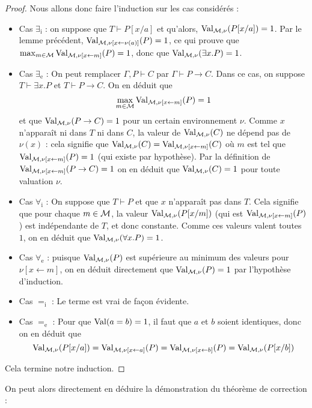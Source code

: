 \begin{proof}
    Nous allons donc faire l'induction sur les cas considérés :
    \begin{itemize}[label=$\bullet$]
        \item Cas $\exists_\mathrm i$ : on suppose que $T\vdash P[x/a]$ et qu'alors, $\mathrm{Val}_{\mathcal M,\nu}(P[x/a]) = 1$. Par le lemme précédent, $\mathrm{Val}_{\mathcal M,\nu[x \leftarrow \nu(a)]}(P)=1$, ce qui prouve que $\max_{m\in\mathcal M} \mathrm{Val}_{\mathcal M,\nu[x \leftarrow m]}(P) = 1$, donc que $\mathrm{Val}_{\mathcal M,\nu}(\exists x.P) = 1$.
        \item Cas $\exists_\mathrm e$ : On peut remplacer $\Gamma,P\vdash C$ par $\Gamma\vdash P\to C$. Dans ce cas, on suppose $T\vdash \exists x.P$ et $T\vdash P \to C$. On en déduit que $$\max_{m\in\mathcal M} \mathrm{Val}_{\mathcal M,\nu[x\leftarrow m]}(P) = 1$$ et que $\mathrm{Val}_{\mathcal M,\nu}(P\to C) = 1$ pour un certain environnement $\nu$. Comme $x$ n'apparaît ni dans $T$ ni dans $C$, la valeur de $\mathrm{Val}_{\mathcal M,\nu}(C)$ ne dépend pas de $\nu(x)$ : cela signifie que $\mathrm{Val}_{\mathcal M,\nu}(C)=\mathrm{Val}_{\mathcal M,\nu[x \leftarrow m]}(C)$ où $m$ est tel que $\mathrm{Val}_{\mathcal M,\nu[x \leftarrow m]}(P) = 1$ (qui existe par hypothèse). Par la définition de $\mathrm{Val}_{\mathcal M,\nu[x\leftarrow m]}(P\to C) = 1$ on en déduit que $\mathrm{Val}_{\mathcal M,\nu}(C) = 1$ pour toute valuation $\nu$.
        \item Cas $\forall_\mathrm i$ : On suppose que $T\vdash P$ et que $x$ n'apparaît pas dans $T$. Cela signifie que pour chaque $m\in\mathcal M$, la valeur $\mathrm{Val}_{\mathcal M,\nu}(P[x/m])$ (qui est $\mathrm{Val}_{\mathcal M,\nu[x\leftarrow m]}(P)$) est indépendante de $T$, et donc constante. Comme ces valeurs valent toutes $1$, on en déduit que $\mathrm{Val}_{\mathcal M,\nu}(\forall x.P)=1$.
        \item Cas $\forall_\mathrm e$ : puisque $\mathrm{Val}_{\mathcal M,\nu}(P)$ est supérieure au minimum des valeurs pour $\nu[x\leftarrow m]$, on en déduit directement que $\mathrm{Val}_{\mathcal M,\nu}(P)=1$ par l'hypothèse d'induction.
        \item Cas $=_\mathrm i$ : Le terme est vrai de façon évidente.
        \item Cas $=_\mathrm e$ : Pour que $\mathrm{Val}(a=b)=1$, il faut que $a$ et $b$ soient identiques, donc on en déduit que $$\mathrm{Val}_{\mathcal M,\nu}(P[x/a])=\mathrm{Val}_{\mathcal M,\nu[x\leftarrow a]}(P)=\mathrm{Val}_{\mathcal M,\nu[x\leftarrow b]}(P) = \mathrm{Val}_{\mathcal M,\nu}(P[x/b])$$
    \end{itemize}
    Cela termine notre induction.
\end{proof}

On peut alors directement en déduire la démonstration du théorème de correction :

